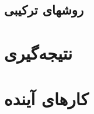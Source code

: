 \documentclass{report}
\begin{document}
\subsection{روشهای ترکیبی}


\section{نتیجه‌گیری}

\section{کارهای آینده}



\end{document}
